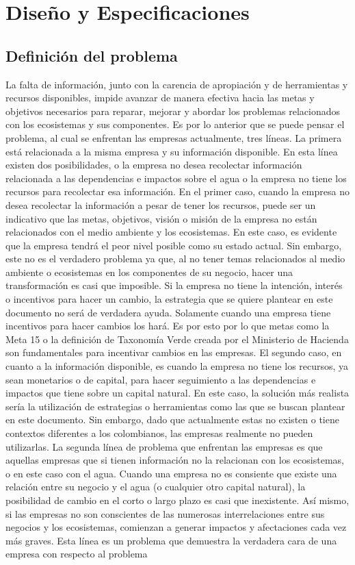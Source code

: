 \section{Diseño y Especificaciones} \label{sec:definicion-especificaciones}

\subsection{Definición del problema}\label{subsec:definicion-problema}
La falta de información, junto con la carencia de apropiación y de herramientas y recursos disponibles, impide avanzar de manera efectiva hacia las metas y objetivos necesarios para reparar, mejorar y abordar los problemas relacionados con los ecosistemas y sus componentes. Es por lo anterior que se puede pensar el problema, al cual se enfrentan las empresas actualmente, tres líneas. La primera está relacionada a la misma empresa y su información disponible. En esta línea existen dos posibilidades, o la empresa no desea recolectar información relacionada a las dependencias e impactos sobre el agua o la empresa no tiene los recursos para recolectar esa información. En el primer caso, cuando la empresa no desea recolectar la información a pesar de tener los recursos, puede ser un indicativo que las metas, objetivos, visión o misión de la empresa no están relacionados con el medio ambiente y los ecosistemas. En este caso, es evidente que la empresa tendrá el peor nivel posible como su estado actual. Sin embargo, este no es el verdadero problema ya que, al no tener temas relacionados al medio ambiente o ecosistemas en los componentes de su negocio, hacer una transformación es casi que imposible. Si la empresa no tiene la intención, interés o incentivos para hacer un cambio, la estrategia que se quiere plantear en este documento no será de verdadera ayuda. Solamente cuando una empresa tiene incentivos para hacer cambios los hará. Es por esto por lo que metas como la Meta 15 o la definición de Taxonomía Verde creada por el Ministerio de Hacienda son fundamentales para incentivar cambios en las empresas. El segundo caso, en cuanto a la información disponible, es cuando la empresa no tiene los recursos, ya sean monetarios o de capital, para hacer seguimiento a las dependencias e impactos que tiene sobre un capital natural. En este caso, la solución más realista sería la utilización de estrategias o herramientas como las que se buscan plantear en este documento. Sin embargo, dado que actualmente estas no existen o tiene contextos diferentes a los colombianos, las empresas realmente no pueden utilizarlas. La segunda línea de problema que enfrentan las empresas es que aquellas empresas que si tienen información no la relacionan con los ecosistemas, o en este caso con el agua. Cuando una empresa no es consiente que existe una relación entre su negocio y el agua (o cualquier otro capital natural), la posibilidad de cambio en el corto o largo plazo es casi que inexistente. Así mismo, si las empresas no son conscientes de las numerosas interrelaciones entre sus negocios y los ecosistemas, comienzan a generar impactos y afectaciones cada vez más graves. Esta línea es un problema que demuestra la verdadera cara de una empresa con respecto al problema 